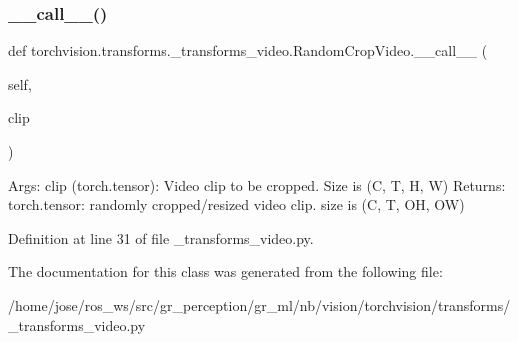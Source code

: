 \subsubsection{\texorpdfstring{\+\_\+\+\_\+call\+\_\+\+\_\+()}{\_\_call\_\_()}}
{\footnotesize\ttfamily def torchvision.\+transforms.\+\_\+transforms\+\_\+video.\+Random\+Crop\+Video.\+\_\+\+\_\+call\+\_\+\+\_\+ (\begin{DoxyParamCaption}\item[{}]{self,  }\item[{}]{clip }\end{DoxyParamCaption})}

\begin{DoxyVerb}Args:
    clip (torch.tensor): Video clip to be cropped. Size is (C, T, H, W)
Returns:
    torch.tensor: randomly cropped/resized video clip.
size is (C, T, OH, OW)
\end{DoxyVerb}
 

Definition at line 31 of file \+\_\+transforms\+\_\+video.\+py.



The documentation for this class was generated from the following file\+:\begin{DoxyCompactItemize}
\item 
/home/jose/ros\+\_\+ws/src/gr\+\_\+perception/gr\+\_\+ml/nb/vision/torchvision/transforms/\+\_\+transforms\+\_\+video.\+py\end{DoxyCompactItemize}
